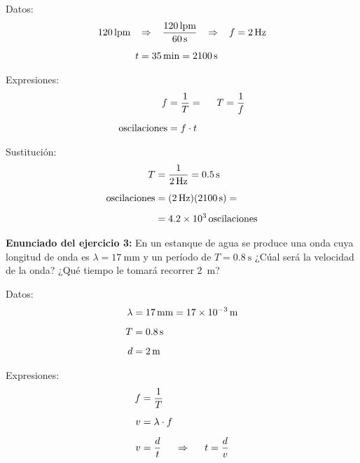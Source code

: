 \documentclass[12pt, letter]{article}
\begin{document}
Datos:
\begin{eqnarray*}
\begin{aligned}
120 \, \text{lpm}  \hspace{0.3cm} &\Rightarrow \hspace{0.3cm} \dfrac{120 \, \text{lpm}}{\SI{60}{\second}}  \hspace{0.3cm} \Rightarrow \hspace{0.3cm} f = \SI{2}{\hertz} \\[0.5em] 
t &= \SI{35}{\minute} =  \SI{2100}{\second}
\end{aligned}
\end{eqnarray*}

Expresiones:
\begin{eqnarray*}
\begin{aligned}
f &= \dfrac{1}{T} =  \hspace{0.5cm} T = \dfrac{1}{f} \\[0.5em] 
\text{oscilaciones} &= f \cdot t 
\end{aligned}
\end{eqnarray*}

Sustitución:
\begin{eqnarray*}
\begin{aligned}
T &= \dfrac{1}{\SI{2}{\hertz}} =  \SI{0.5}{\second} \\[0.5em] 
\text{oscilaciones} &= (\SI{2}{\hertz})(\SI{2100}{\second}) = \\[0.5em] 
&= \num{4.2d3} \, \text{oscilaciones}
\end{aligned}
\end{eqnarray*}

\textbf{Enunciado del ejercicio 3: } En un estanque de agua se produce una onda cuya longitud de onda es $\lambda = \SI{17}{\milli\meter}$ y un período de $T = \SI{0.8}{\second}$ ¿Cúal será la velocidad de la onda? ¿Qué tiempo le tomará recorrer \SI{2}{\meter}?

Datos:
\begin{eqnarray*}
\begin{aligned}
\lambda &= \SI{17}{\milli\meter} =  \SI{17d-3}{\meter}\\[0.5em] 
T &= \SI{0.8}{\second} \\[0.5em] 
d &= \SI{2}{\meter}
\end{aligned}
\end{eqnarray*}

Expresiones:
\begin{eqnarray*}
\begin{aligned}
f &= \dfrac{1}{T} \\[0.5em] 
v &= \lambda \cdot f \\[0.5em] 
v &= \dfrac{d}{t} \hspace{0.5cm} \Rightarrow \hspace{0.5cm} t = \dfrac{d}{v}
\end{aligned}
\end{eqnarray*}
\end{document}
